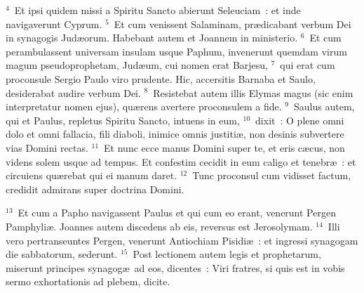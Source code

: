 ${}^{4}$~Et ipsi quidem missi a Spiritu Sancto abierunt Seleuciam~: et inde navigaverunt Cyprum.
${}^{5}$~Et cum venissent Salaminam, pr\ae dicabant verbum Dei in synagogis Jud\ae orum. Habebant autem et Joannem in ministerio.
${}^{6}$~Et cum perambulassent universam insulam usque Paphum, invenerunt quemdam virum magum pseudoprophetam, Jud\ae um, cui nomen erat Barjesu,
${}^{7}$~qui erat cum proconsule Sergio Paulo viro prudente. Hic, accersitis Barnaba et Saulo, desiderabat audire verbum Dei.
${}^{8}$~Resistebat autem illis Elymas magus (sic enim interpretatur nomen ejus), qu\ae rens avertere proconsulem a fide.
${}^{9}$~Saulus autem, qui et Paulus, repletus Spiritu Sancto, intuens in eum,
${}^{10}$~dixit~: O plene omni dolo et omni fallacia, fili diaboli, inimice omnis justiti\ae , non desinis subvertere vias Domini rectas.
${}^{11}$~Et nunc ecce manus Domini super te, et eris c\ae cus, non videns solem usque ad tempus. Et confestim cecidit in eum caligo et tenebr\ae~: et circuiens qu\ae rebat qui ei manum daret.
${}^{12}$~Tunc proconsul cum vidisset factum, credidit admirans super doctrina Domini.


${}^{13}$~Et cum a Papho navigassent Paulus et qui cum eo erant, venerunt Pergen Pamphyli\ae . Joannes autem discedens ab eis, reversus est Jerosolymam.
${}^{14}$~Illi vero pertranseuntes Pergen, venerunt Antiochiam Pisidi\ae~: et ingressi synagogam die sabbatorum, sederunt.
${}^{15}$~Post lectionem autem legis et prophetarum, miserunt principes synagog\ae\ ad eos, dicentes~: Viri fratres, si quis est in vobis sermo exhortationis ad plebem, dicite.


